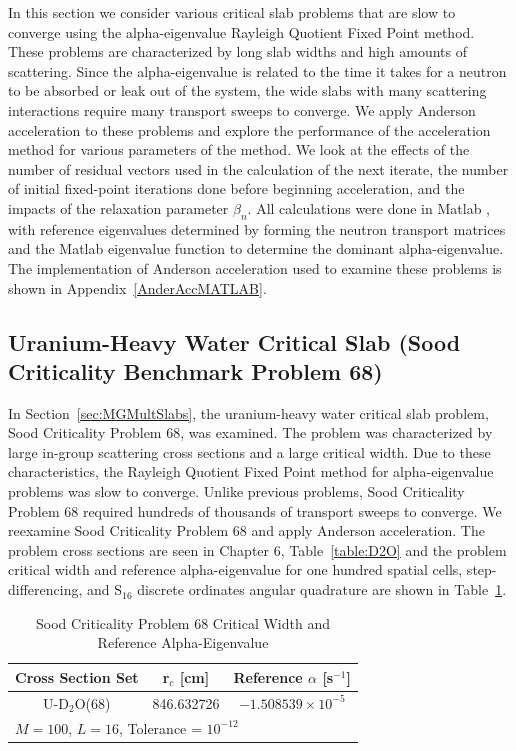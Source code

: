 In this section we consider various critical slab problems that are slow to converge using the alpha-eigenvalue Rayleigh Quotient Fixed Point method. These problems are characterized by long slab widths and high amounts of scattering. Since the alpha-eigenvalue is related to the time it takes for a neutron to be absorbed or leak out of the system, the wide slabs with many scattering interactions require many transport sweeps to converge. We apply Anderson acceleration to these problems and explore the performance of the acceleration method for various parameters of the method. We look at the effects of the number of residual vectors used in the calculation of the next iterate, the number of initial fixed-point iterations done before beginning acceleration, and the impacts of the relaxation parameter $\beta_{n}$. All calculations were done in Matlab \cite{MATLAB:2019}, with reference eigenvalues determined by forming the neutron transport matrices and the Matlab eigenvalue function to determine the dominant alpha-eigenvalue. The implementation of Anderson acceleration used to examine these problems is shown in Appendix~\ref{AnderAccMATLAB}.

\subsection{Uranium-Heavy Water Critical Slab (Sood Criticality Benchmark Problem 68)}

In Section~\ref{sec:MGMultSlabs}, the uranium-heavy water critical slab problem, Sood Criticality Problem 68, was examined. The problem was characterized by large in-group scattering cross sections and a large critical width. Due to these characteristics, the Rayleigh Quotient Fixed Point method for alpha-eigenvalue problems was slow to converge. Unlike previous problems, Sood Criticality Problem 68 required hundreds of thousands of transport sweeps to converge. We reexamine Sood Criticality Problem 68 and apply Anderson acceleration. The problem cross sections are seen in Chapter 6, Table~\ref{table:D2O} and the problem critical width and reference alpha-eigenvalue for one hundred spatial cells, step-differencing, and S$_{16}$ discrete ordinates angular quadrature are shown in Table~\ref{table:Sood68Ref}.

\begin{table}[b]
\caption{Sood Criticality Problem 68 Critical Width and Reference Alpha-Eigenvalue \cite{sood2003analytical}}
	\label{table:Sood68Ref}
	\begin{subtable}[h]{1.0\textwidth}
	\centering{}
	\begin{tabular}{@{}ccc@{}}\toprule
	Cross Section Set & r$_{c}$ [cm] & Reference $\alpha$ [s$^{-1}$] \\
	\midrule
	U-D$_{2}$O(68) & 846.632726 & $-1.508539 \times 10^{-5}$ \\
	\bottomrule%
	\multicolumn{3}{l}{$M = 100$, $L = 16$, Tolerance = $10^{-12}$} \\
	\end{tabular}
	\end{subtable}%
\end{table}

